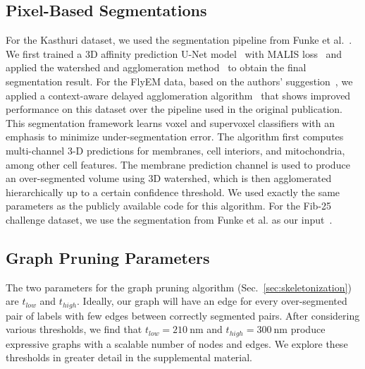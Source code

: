 \subsection{Pixel-Based Segmentations}
\label{sec:neuroproof}

For the Kasthuri dataset, we used the segmentation pipeline from Funke et al.~\cite{funke2017deep}. 
We first trained a 3D affinity prediction U-Net model~\cite{ronneberger2015u} with MALIS loss~\cite{Turaga:2009} and applied the watershed and agglomeration method~\cite{funke2017deep} to obtain the final segmentation result.
For the FlyEM data, based on the authors' suggestion~\cite{takemura2017connectome}, we applied a context-aware delayed agglomeration algorithm~\cite{10.1371/journal.pone.0125825} that shows improved performance on this dataset over the pipeline used in the original publication. 
This segmentation framework learns voxel and supervoxel classifiers with an emphasis to minimize under-segmentation error. 
The algorithm first computes multi-channel 3-D predictions for membranes, cell interiors, and mitochondria, among other cell features. 
The membrane prediction channel is used to produce an over-segmented volume using 3D watershed, which is then agglomerated hierarchically up to a certain confidence threshold. 
We used exactly the same parameters as the publicly available code for this algorithm.
For the Fib-25 challenge dataset, we use the segmentation from Funke et al. as our input~\cite{funke2017deep}.

\subsection{Graph Pruning Parameters}

The two parameters for the graph pruning algorithm (Sec.~\ref{sec:skeletonization}) are $t_{low}$ and $t_{high}$. 
Ideally, our graph will have an edge for every over-segmented pair of labels with few edges between correctly segmented pairs. 
After considering various thresholds, we find that $t_{low} = \SI{210}{\nano\meter}$ and $t_{high} = \SI{300}{\nano\meter}$ produce expressive graphs with a scalable number of nodes and edges.
We explore these thresholds in greater detail in the supplemental material.

